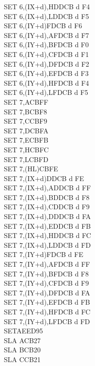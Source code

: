 \begin{multicols}{3}
{\begin{tabbing}
		SET 6,(IX+d),H\UNDOC\>DDCB d F4\\
		SET 6,(IX+d),L\UNDOC\>DDCB d F5\\
		SET 6,(IY+d)\>FDCB d F6\\
		SET 6,(IY+d),A\UNDOC\>FDCB d F7\\
		SET 6,(IY+d),B\UNDOC\>FDCB d F0\\
		SET 6,(IY+d),C\UNDOC\>FDCB d F1\\
		SET 6,(IY+d),D\UNDOC\>FDCB d F2\\
		SET 6,(IY+d),E\UNDOC\>FDCB d F3\\
		SET 6,(IY+d),H\UNDOC\>FDCB d F4\\
		SET 6,(IY+d),L\UNDOC\>FDCB d F5\\
		SET 7,A\>CBFF\\
		SET 7,B\>CBF8\\
		SET 7,C\>CBF9\\
		SET 7,D\>CBFA\\
		SET 7,E\>CBFB\\
		SET 7,H\>CBFC\\
		SET 7,L\>CBFD\\
		SET 7,(HL)\>CBFE\\
		SET 7,(IX+d)\>DDCB d FE\\
		SET 7,(IX+d),A\UNDOC\>DDCB d FF\\
		SET 7,(IX+d),B\UNDOC\>DDCB d F8\\
		SET 7,(IX+d),C\UNDOC\>DDCB d F9\\
		SET 7,(IX+d),D\UNDOC\>DDCB d FA\\
		SET 7,(IX+d),E\UNDOC\>DDCB d FB\\
		SET 7,(IX+d),H\UNDOC\>DDCB d FC\\
		SET 7,(IX+d),L\UNDOC\>DDCB d FD\\
		SET 7,(IY+d)\>FDCB d FE\\
		SET 7,(IY+d),A\UNDOC\>FDCB d FF\\
		SET 7,(IY+d),B\UNDOC\>FDCB d F8\\
		SET 7,(IY+d),C\UNDOC\>FDCB d F9\\
		SET 7,(IY+d),D\UNDOC\>FDCB d FA\\
		SET 7,(IY+d),E\UNDOC\>FDCB d FB\\
		SET 7,(IY+d),H\UNDOC\>FDCB d FC\\
		SET 7,(IY+d),L\UNDOC\>FDCB d FD\\
		SETAE\ZXN\>ED95\\
		SLA A\>CB27\\
		SLA B\>CB20\\
		SLA C\>CB21\\

\end{tabbing}}
\end{multicols}
